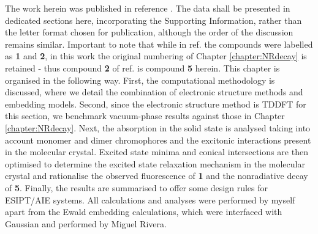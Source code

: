 The work herein was published in reference . The data shall be presented in dedicated sections here, incorporating the Supporting Information, rather than the letter format chosen for publication, although the order of the discussion remains similar. Important to note that while in ref.  the compounds were labelled as \textbf{1} and \textbf{2}, in this work the original numbering of Chapter \ref{chapter:NRdecay} is retained - thus compound \textbf{2} of ref.  is compound \textbf{5} herein. This chapter is organised in the following way. First, the computational methodology is discussed, where we detail the combination of electronic structure methods and embedding models. Second, since the electronic structure method is \ac{TDDFT} for this section, we benchmark vacuum-phase results against those in Chapter \ref{chapter:NRdecay}. Next, the absorption in the solid state is analysed taking into account monomer and dimer chromophores and the excitonic interactions present in the molecular crystal. Excited state minima and conical intersections are then optimised to determine the excited state relaxation mechanism in the molecular crystal and rationalise the observed fluorescence of \textbf{1} and the nonradiative decay of \textbf{5}. Finally, the results are summarised to offer some design rules for ESIPT/AIE systems. All calculations and analyses were performed by myself apart from the Ewald embedding calculations, which were interfaced with Gaussian and performed by Miguel Rivera.

